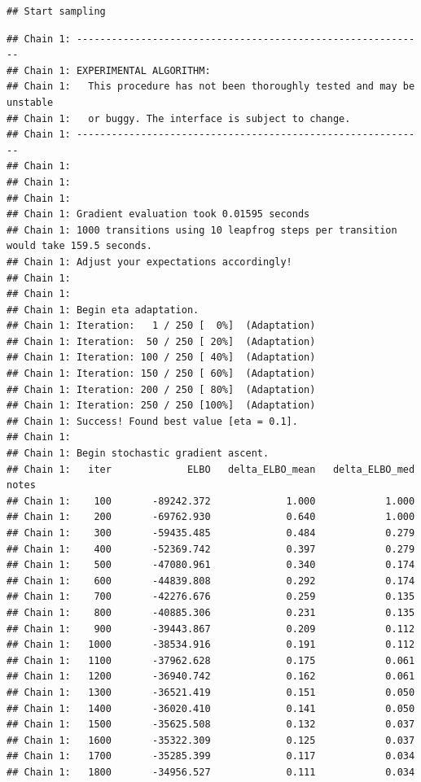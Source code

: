 \documentclass[
]{article}
\begin{document}
\begin{verbatim}
## Start sampling
\end{verbatim}

\begin{verbatim}
## Chain 1: ------------------------------------------------------------
## Chain 1: EXPERIMENTAL ALGORITHM:
## Chain 1:   This procedure has not been thoroughly tested and may be unstable
## Chain 1:   or buggy. The interface is subject to change.
## Chain 1: ------------------------------------------------------------
## Chain 1: 
## Chain 1: 
## Chain 1: 
## Chain 1: Gradient evaluation took 0.01595 seconds
## Chain 1: 1000 transitions using 10 leapfrog steps per transition would take 159.5 seconds.
## Chain 1: Adjust your expectations accordingly!
## Chain 1: 
## Chain 1: 
## Chain 1: Begin eta adaptation.
## Chain 1: Iteration:   1 / 250 [  0%]  (Adaptation)
## Chain 1: Iteration:  50 / 250 [ 20%]  (Adaptation)
## Chain 1: Iteration: 100 / 250 [ 40%]  (Adaptation)
## Chain 1: Iteration: 150 / 250 [ 60%]  (Adaptation)
## Chain 1: Iteration: 200 / 250 [ 80%]  (Adaptation)
## Chain 1: Iteration: 250 / 250 [100%]  (Adaptation)
## Chain 1: Success! Found best value [eta = 0.1].
## Chain 1: 
## Chain 1: Begin stochastic gradient ascent.
## Chain 1:   iter             ELBO   delta_ELBO_mean   delta_ELBO_med   notes 
## Chain 1:    100       -89242.372             1.000            1.000
## Chain 1:    200       -69762.930             0.640            1.000
## Chain 1:    300       -59435.485             0.484            0.279
## Chain 1:    400       -52369.742             0.397            0.279
## Chain 1:    500       -47080.961             0.340            0.174
## Chain 1:    600       -44839.808             0.292            0.174
## Chain 1:    700       -42276.676             0.259            0.135
## Chain 1:    800       -40885.306             0.231            0.135
## Chain 1:    900       -39443.867             0.209            0.112
## Chain 1:   1000       -38534.916             0.191            0.112
## Chain 1:   1100       -37962.628             0.175            0.061
## Chain 1:   1200       -36940.742             0.162            0.061
## Chain 1:   1300       -36521.419             0.151            0.050
## Chain 1:   1400       -36020.410             0.141            0.050
## Chain 1:   1500       -35625.508             0.132            0.037
## Chain 1:   1600       -35322.309             0.125            0.037
## Chain 1:   1700       -35285.399             0.117            0.034
## Chain 1:   1800       -34956.527             0.111            0.034

\end{verbatim}
\end{document}
